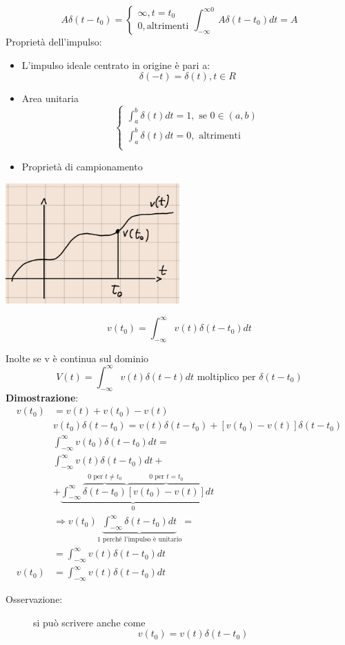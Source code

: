 \documentclass[a4paper, 12pt]{book}
\theoremstyle{plain}
\begin{document}
\[
    A\delta(t - t_0) = \begin{cases}
        \infty, t = t_0\\
        0, \textrm{altrimenti}
    \end{cases}    
    \int_{-\infty}^{\infty0} A\delta(t - t_0) dt = A
\]
Proprietà dell'impulso:
\begin{itemize}
    \item L'impulso ideale centrato in origine è pari a: \[\delta(-t) = \delta(t), t \in R\]
    \item Area unitaria \[\begin{cases}
        \int_a^b \delta(t)dt = 1, \textrm{ se } 0 \in (a, b)\\
        \int_a^b \delta(t)dt = 0, \textrm{ altrimenti}\\
    \end{cases}\]
    \item Proprietà di campionamento
\end{itemize}

\begin{center}
    \includegraphics[width=0.5\textwidth]{campionamento.png}
\end{center}

\[
    v(t_0) = \int_{-\infty}^\infty v(t) \delta(t - t_0) dt    
\]

Inolte se v è continua sul dominio 
\[
    V(t) =   \int_{-\infty}^\infty v(t) \delta(t - t) dt \textrm{ moltiplico per } \delta(t - t_0)
\]
\textbf{Dimostrazione}:  
\[
    \begin{split}
        v(t_0) &= v(t) + v(t_0) - v(t)\\
        &v(t_0) \delta(t- t_0) = v(t) \delta(t - t_0) + [v(t_0) - v(t)] \delta(t - t_0)\\
        &\int_{-\infty}^\infty v(t_0) \delta(t - t_0)dt =\\
        &\int_{-\infty}^\infty v(t) \delta(t - t_0) dt +\\
        &+ \underbrace{\int_{-\infty}^\infty \overbrace{\delta(t - t_0)}^{0 \textrm{ per } t \neq t_0} \overbrace{[v(t_0) - v(t)]}^{0 \textrm{ per } t = t_0}}_0dt\\
        &\Rightarrow v(t_0) \underbrace{\int_{-\infty}^\infty \delta(t - t_0) dt}_{1 \textrm{ perché l'impulso è unitario}} = \\
        &= \int_{-\infty}^\infty v(t) \delta(t - t_0) dt\\
        v(t_0) &= \int_{-\infty}^\infty v(t) \delta(t - t_0) dt
    \end{split}    
\] 
\begin{description}
    \item[Osservazione: ] si può scrivere anche come \[v(t_0)  = v(t) \delta (t - t_0)\] 
\end{description}
\end{document}
